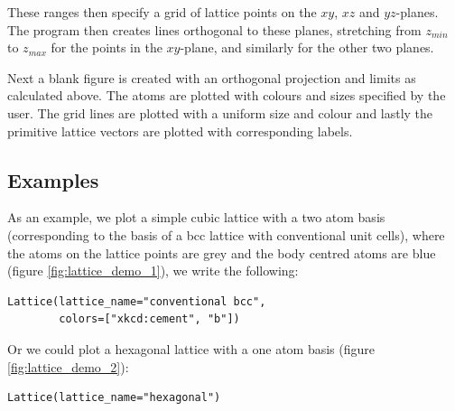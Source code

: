 \documentclass[main.tex]{subfiles}
\begin{document}
	These ranges then specify a grid of lattice points on the $ xy$, $ xz $ and $ yz $-planes. The program then creates lines orthogonal to these planes, stretching from $ z_{min} $ to $ z_{max} $ for the points in the $ xy $-plane, and similarly for the other two planes.
	
	Next a blank figure is created with an orthogonal projection and limits as calculated above. The atoms are plotted with colours and sizes specified by the user. The grid lines are plotted with a uniform size and colour and lastly the primitive lattice vectors are plotted with corresponding labels.
	
	\subsection{Examples}
	As an example, we plot a simple cubic lattice with a two atom basis (corresponding to the basis of a bcc lattice with conventional unit cells), where the atoms on the lattice points are grey and the body centred atoms are blue (figure \ref{fig:lattice_demo_1}), we write the following:
\begin{lstlisting}
Lattice(lattice_name="conventional bcc",
		colors=["xkcd:cement", "b"])
\end{lstlisting}
	Or we could plot a hexagonal lattice with a one atom basis (figure \ref{fig:lattice_demo_2}):
\begin{lstlisting}
Lattice(lattice_name="hexagonal")
\end{lstlisting}
\end{document}
